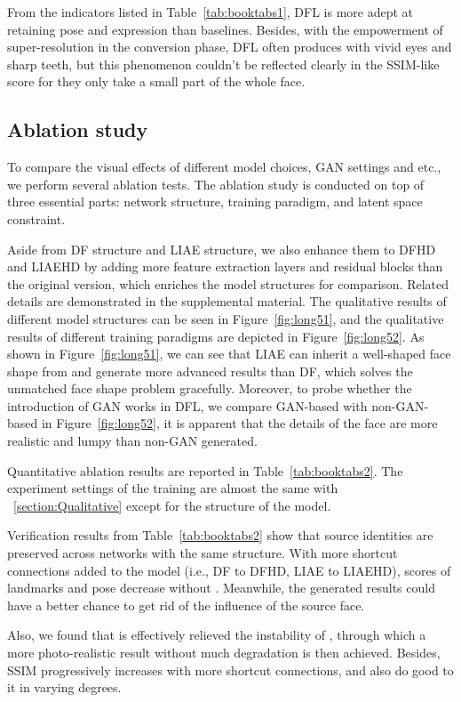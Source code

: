 \documentclass[10pt,twocolumn,letterpaper]{article}
\begin{document}
From the indicators listed in Table~\ref{tab:booktabs1}, DFL is more adept at retaining pose and expression than baselines. Besides, with the empowerment of super-resolution in the conversion phase, DFL often produces  with vivid eyes and sharp teeth, but this phenomenon couldn't be reflected clearly in the SSIM-like score for they only take a small part of the whole face.

\subsection{Ablation study}

To compare the visual effects of different model choices, GAN settings and etc., we perform several ablation tests. The ablation study is conducted on top of three essential parts: network structure, training paradigm, and latent space constraint.

Aside from DF structure and LIAE structure, we also enhance them to DFHD and LIAEHD by adding more feature extraction layers and residual blocks than the original version, which enriches the model structures for comparison. Related details are demonstrated in the supplemental material. The qualitative results of different model structures can be seen in Figure~\ref{fig:long51}, and the qualitative results of different training paradigms are depicted in Figure~\ref{fig:long52}. As shown in Figure~\ref{fig:long51}, we can see that LIAE can inherit a well-shaped face shape from  and generate more advanced results than DF, which solves the unmatched face shape problem gracefully. Moreover, to probe whether the introduction of GAN works in DFL, we compare GAN-based with non-GAN-based in Figure~\ref{fig:long52}, it is apparent that the details of the face are more realistic and lumpy than non-GAN generated.

Quantitative ablation results are reported in Table~\ref{tab:booktabs2}. The experiment settings of the training are almost the same with ~\ref{section:Qualitative} except for the structure of the model.

Verification results from Table~\ref{tab:booktabs2} show that source identities are preserved across networks with the same structure. With more shortcut connections added to the model (i.e., DF to DFHD, LIAE to LIAEHD), scores of landmarks and pose decrease without . Meanwhile, the generated results could have a better chance to get rid of the influence of the source face.

Also, we found that  is effectively relieved the instability of , through which a more photo-realistic result without much degradation is then achieved. Besides, SSIM progressively increases with more shortcut connections,  and  also do good to it in varying degrees.
\end{document}
